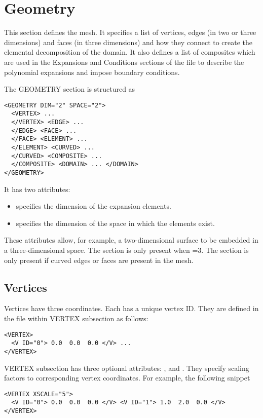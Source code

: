 \section{Geometry}
This section defines the mesh. It specifies a list of vertices, edges (in two or
three dimensions) and faces (in three dimensions) and how they connect to create
the elemental decomposition of the domain. It also defines a list of composites
which are used in the Expansions and Conditions sections of the file to describe
the polynomial expansions and impose boundary conditions.

The GEOMETRY section is structured as \begin{lstlisting}[style=XMLStyle]
<GEOMETRY DIM="2" SPACE="2">
  <VERTEX> ...
  </VERTEX> <EDGE> ...
  </EDGE> <FACE> ...
  </FACE> <ELEMENT> ...
  </ELEMENT> <CURVED> ...
  </CURVED> <COMPOSITE> ...
  </COMPOSITE> <DOMAIN> ... </DOMAIN>
</GEOMETRY>
\end{lstlisting}
It has two attributes:
\begin{itemize}
    \item {} specifies the dimension of the expansion elements.
    \item {} specifies the dimension of the space in which the
    elements exist.
\end{itemize}

These attributes allow, for example, a two-dimensional surface to be embedded in
a three-dimensional space. The  section is only present when
=3.
The  section is only present if curved edges or faces are present
in the mesh.

\subsection{Vertices}

Vertices have three coordinates. Each has a unique vertex ID. They are defined
in the file within VERTEX subsection as follows:
\begin{lstlisting}[style=XMLStyle] <VERTEX>
  <V ID="0"> 0.0  0.0  0.0 </V> ...
</VERTEX>
\end{lstlisting}
VERTEX subsection has three optional attributes: ,
 and . They specify scaling factors to
corresponding vertex coordinates.
For example, the following snippet

\begin{lstlisting}[style=XMLStyle] 
<VERTEX XSCALE="5">
  <V ID="0"> 0.0  0.0  0.0 </V> <V ID="1"> 1.0  2.0  0.0 </V>
</VERTEX>
\end{lstlisting}

